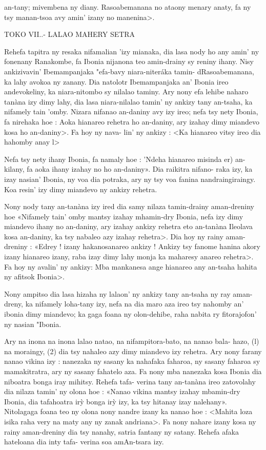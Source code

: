 an-tany; mivembena ny diany. Rasoabemanana no ataony menary anaty,
fa ny tsy manan-tsoa avy amin' izany no manenina>.

TOKO VII..- LALAO MAHERY SETRA

Rehefa tapitra ny resaka nifamalian 'izy mianaka, dia lasa nody ho any
amin' ny fonenany Ranakombe, fa Ibonia nijanona teo amin-drainy sy reniny
ihany. Nisy ankizivavin' Ibemampanjaka "efa-bavy niara-niteráka tamin-
dRasoabemanana, ka lahy avokoa ny zanany. Dia natolotr Ibemampanjaka
an' Ibonia ireo andevokeliny, ka niara-nitombo sy nilalao taminy. Ary nony
efa lehibe naharo tanàna izy dimy lahy, dia lasa niara-nilalao tamin' ny
ankizy tany an-tsaha, ka nifamely tain 'omby. Nizara nifanao an-daniny avy
izy ireo; nefa tsy nety Ibonia, fa nirehaka hoe : Aoka hianareo rehetra ho
an-daniny, ary izahay dimy miandevo kosa ho an-daniny>. Fa hoy ny nava-
lin' ny ankizy : <Ka hianareo vitsy ireo dia hahomby anay l>

Nefa tsy nety ihany Ibonia, fa namaly hoe : 'Ndeha hianareo misinda
er) an-kilany, fa aoka ihany izahay no ho an-daniny». Dia raikitra nifano-
raka izy, ka izay nasian' Ibonia, ny voa dia potraka, ary ny tsy voa fanina
nandraingiraingy. Koa resin' izy dimy miandevo ny ankizy rehetra.

Nony nody tany an-tanàna izy ired dia samy nilaza tamin-drainy
aman-dreniny hoe «Nifamely tain' omby mantsy izahay mhamin-dry
Ibonia, nefa izy dimy miandevo ihany no an-daniny, ary izahay ankizy
rehetra eto an-tanàna Ileolava kosa an-daniny, ka tsy nabaleo azy izahay
rehetra>. Dia hoy ny rainy aman-dreniny : «Edrey ! izany hakanosanareo
ankizy ! Ankizy tsy fanome hanina akory izany hianareo izany, raba izay
dimy lahy monja ka maharesy anareo rehetra>. Fa hoy ny avalin' ny
ankizy: Mba mankanesa ange hianareo any an-tsaha hahita ny afitsok
Ibonia>.

Nony ampitso dia lasa hizaha ny lalaon' ny ankizy tany an-tsaha ny
ray aman-dreny, ka nifamely loha-tany izy, nefa na dia maro aza ireo tsy
nahomby an' ibonia dimy miandevo; ka gaga foana ny olon-dehibe, raha
nabita ry fitorajofon' ny nasian "Ibonia.

Ary na inona na inona lalao natao, na nifampitora-bato, na nanao bala-
hazo, (l) na moraingy, (2) dia tsy nahaleo azy dimy miandevo izy rehetra.
Ary nony farany nanao vikina izy : nanezaka ny sasany ka nahafaka faharoa,
ny sasany faharoa sy mamakitratra, ary ny sasany fahatelo aza. Fa nony
mba nanezaka kosa Ibonia dia niboatra bonga iray mihitsy. Rehefa tafa-
verina tany an-tanàna ireo zatovolahy dia nilaza tamin' ny olona hoe :
«Nanao vikina mantsy izahay mbamin-dry Ibonia, dia tafahoatra irỳ bonga
irỳ izy, ka tsy hitanay izay nalehany». Nitolagaga foana teo ny olona nony
nandre izany ka nanao hoe : <Mahita loza isika raha very na maty any ny
zanak andriana>. Fa nony nahare izany kosa ny rainy aman-dreniny dia
tsy nanahy, satria fantany ny satany. Rehefa afaka hateloana dia inty tafa-
verina soa amAn-tsara izy.


